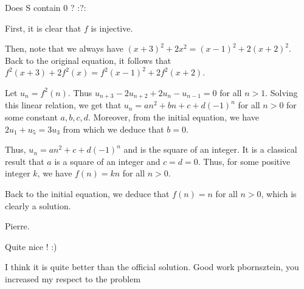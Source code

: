 \begin{solution}
	Does S contain 0 ? :?:
\end{solution}



\begin{solution}
	First, it is clear that $ f$ is injective.

Then, note that we always have $ (x+3)^2 + 2x^2 = (x-1)^2 +2 (x+2)^2$. Back to the original equation, it follows that $ f^2(x+3) + 2f^2(x) = f^2(x-1)^2 +2f^2 (x+2)$.

Let $ u_n = f^2(n)$. Thus $ u_{n+3} - 2u_{n+2} + 2u_n - u_{n-1} = 0$ for all $ n>1$.
Solving this linear relation, we get that $ u_n = an^2 + bn + c + d(-1)^n$ for all $ n > 0$ for some constant $ a,b,c,d$.
Moreover, from the initial equation, we have $ 2u_1 + u_5 = 3u_3$ from which we deduce that $ b = 0$.

Thus, $ u_n = an^2  + c + d(-1)^n$ and is the square of an integer. It is a classical result that $ a$ is a square of an integer and $ c=d=0$.
Thus, for some positive integer $ k$, we have $ f(n) = kn$ for all $ n>0$.

Back to the initial equation, we deduce that $ f(n) = n$ for all $ n>0$, which is clearly a solution.

Pierre.
\end{solution}



\begin{solution}
	Quite nice ! :)
\end{solution}



\begin{solution}
	I think it is quite better than the official solution. Good work pbornsztein, you increased my respect to the problem  
\end{solution}



